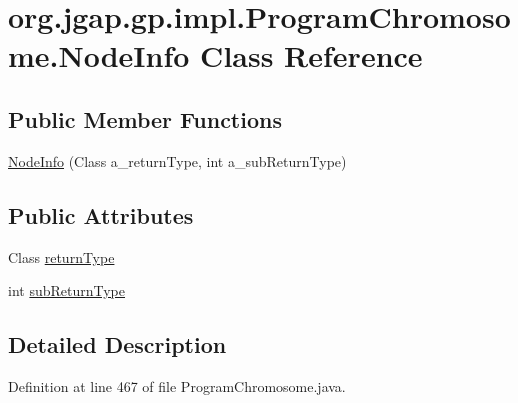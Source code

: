 \hypertarget{classorg_1_1jgap_1_1gp_1_1impl_1_1_program_chromosome_1_1_node_info}{\section{org.\-jgap.\-gp.\-impl.\-Program\-Chromosome.\-Node\-Info Class Reference}
\label{classorg_1_1jgap_1_1gp_1_1impl_1_1_program_chromosome_1_1_node_info}
}
\subsection*{Public Member Functions}
\begin{DoxyCompactItemize}
\item 
\hyperlink{classorg_1_1jgap_1_1gp_1_1impl_1_1_program_chromosome_1_1_node_info_ae4e6f95f844751aa72ade512b7897867}{Node\-Info} (Class a\-\_\-return\-Type, int a\-\_\-sub\-Return\-Type)
\end{DoxyCompactItemize}
\subsection*{Public Attributes}
\begin{DoxyCompactItemize}
\item 
Class \hyperlink{classorg_1_1jgap_1_1gp_1_1impl_1_1_program_chromosome_1_1_node_info_a8e76b928c2b5f101a4f5afd97f12ae31}{return\-Type}
\item 
int \hyperlink{classorg_1_1jgap_1_1gp_1_1impl_1_1_program_chromosome_1_1_node_info_ae3601654472ce3b9c0aff093608aaeee}{sub\-Return\-Type}
\end{DoxyCompactItemize}


\subsection{Detailed Description}


Definition at line 467 of file Program\-Chromosome.\-java.



